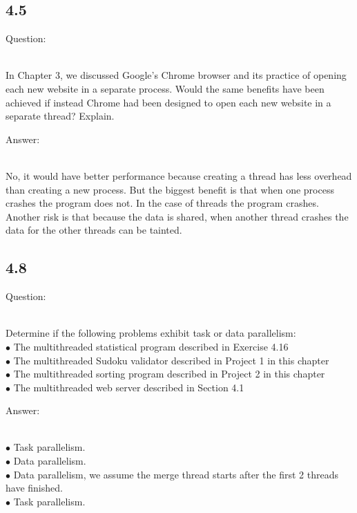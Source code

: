 \documentclass[]{article}
\begin{document}
\subsection*{4.5}
\begin{bfseries} Question: \end{bfseries}\\
In Chapter 3, we discussed Google’s Chrome browser and its practice of
opening each new website in a separate process. Would the same benefits
have been achieved if instead Chrome had been designed to open each
new website in a separate thread? Explain.\\
\begin{bfseries} Answer: \end{bfseries}\\
No, it would have better performance because creating a thread has less overhead than creating a new process. But the biggest benefit is that when one process crashes the program does not. In the case of threads the program crashes. Another risk is that because the data is shared, when another thread crashes the data for the other threads can be tainted.\\

\subsection*{4.8}
\begin{bfseries} Question: \end{bfseries}\\
Determine if the following problems exhibit task or data parallelism:\\
$\bullet$ The multithreaded statistical program described in Exercise 4.16\\
$\bullet$ The multithreaded Sudoku validator described in Project 1 in this chapter\\
$\bullet$ The multithreaded sorting program described in Project 2 in this chapter\\
$\bullet$ The multithreaded web server described in Section 4.1\\
\begin{bfseries} Answer: \end{bfseries}\\
$\bullet$ Task parallelism.\\
$\bullet$ Data parallelism.\\
$\bullet$ Data parallelism, we assume the merge thread starts after the first 2 threads have finished.\\
$\bullet$ Task parallelism.\\
\end{document}
